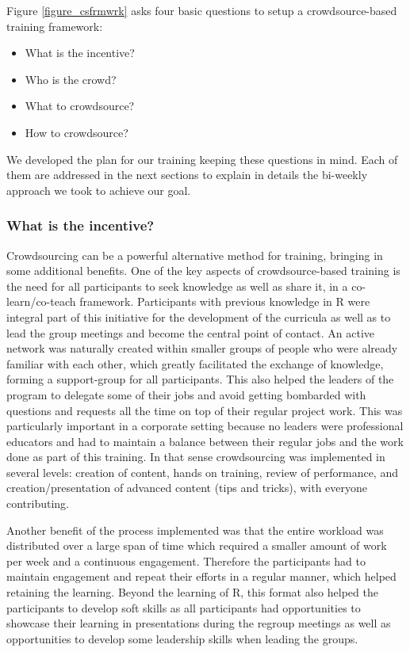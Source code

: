 Figure \ref{figure_csfrmwrk} asks four basic questions to setup a
crowdsource-based training framework:

\begin{itemize}
\tightlist
\item
  What is the incentive?
\item
  Who is the crowd?
\item
  What to crowdsource?
\item
  How to crowdsource?
\end{itemize}

We developed the plan for our training keeping these questions in mind.
Each of them are addressed in the next sections to explain in details
the bi-weekly approach we took to achieve our goal.

\hypertarget{what-is-the-incentive}{%
\subsubsection{What is the incentive?}\label{what-is-the-incentive}}

Crowdsourcing can be a powerful alternative method for training,
bringing in some additional benefits. One of the key aspects of
crowdsource-based training is the need for all participants to seek
knowledge as well as share it, in a co-learn/co-teach framework.
Participants with previous knowledge in R were integral part of this
initiative for the development of the curricula as well as to lead the
group meetings and become the central point of contact. An active
network was naturally created within smaller groups of people who were
already familiar with each other, which greatly facilitated the exchange
of knowledge, forming a support-group for all participants. This also
helped the leaders of the program to delegate some of their jobs and
avoid getting bombarded with questions and requests all the time on top
of their regular project work. This was particularly important in a
corporate setting because no leaders were professional educators and had
to maintain a balance between their regular jobs and the work done as
part of this training. In that sense crowdsourcing was implemented in
several levels: creation of content, hands on training, review of
performance, and creation/presentation of advanced content (tips and
tricks), with everyone contributing.

Another benefit of the process implemented was that the entire workload
was distributed over a large span of time which required a smaller
amount of work per week and a continuous engagement. Therefore the
participants had to maintain engagement and repeat their efforts in a
regular manner, which helped retaining the learning. Beyond the learning
of R, this format also helped the participants to develop soft skills as
all participants had opportunities to showcase their learning in
presentations during the regroup meetings as well as opportunities to
develop some leadership skills when leading the groups.

